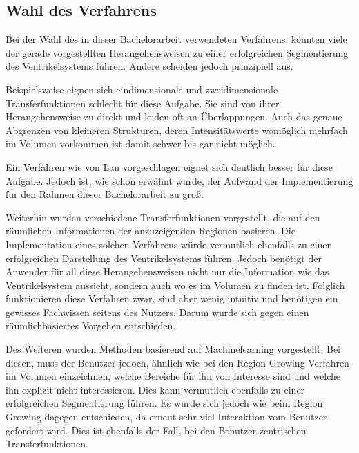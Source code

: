 \subsection{Wahl des Verfahrens}


Bei der Wahl des in dieser Bachelorarbeit verwendeten Verfahrens, könnten viele der gerade vorgestellten Herangehensweisen zu einer erfolgreichen Segmentierung des Ventrikelsystems führen. Andere scheiden jedoch prinzipiell aus.


Beispielsweise eignen sich eindimensionale und zweidimensionale Transferfunktionen schlecht für diese Aufgabe. Sie sind von ihrer Herangehensweise zu direkt und leiden oft an Überlappungen. Auch das genaue Abgrenzen von kleineren Strukturen, deren Intensitätswerte womöglich mehrfach im Volumen vorkommen ist damit schwer bis gar nicht möglich.


Ein Verfahren wie von Lan \cite{lan2017improving} vorgeschlagen eignet sich deutlich besser für diese Aufgabe. Jedoch ist, wie schon erwähnt wurde, der Aufwand der Implementierung für den Rahmen dieser Bachelorarbeit zu groß.


Weiterhin wurden verschiedene Transferfunktionen vorgestellt, die auf den räumlichen Informationen der anzuzeigenden Regionen basieren. Die Implementation eines solchen Verfahrens würde vermutlich ebenfalls zu einer erfolgreichen Darstellung des Ventrikelsystems führen.
\newline
Jedoch benötigt der Anwender für all diese Herangehensweisen nicht nur die Information wie das Ventrikelsystem aussieht, sondern auch wo es im Volumen zu finden ist. Folglich funktionieren diese Verfahren zwar, sind aber wenig intuitiv und benötigen ein gewisses Fachwissen seitens des Nutzers. Darum wurde sich gegen einen räumlichbasiertes Vorgehen entschieden.


Des Weiteren wurden Methoden basierend auf Machinelearning vorgestellt. Bei diesen, muss der Benutzer jedoch, ähnlich wie bei den Region Growing Verfahren im Volumen einzeichnen, welche Bereiche für ihn von Interesse sind und welche ihn explizit nicht interessieren.
\newline
Dies kann vermutlich ebenfalls zu einer erfolgreichen Segmentierung führen. Es wurde sich jedoch wie beim Region Growing dagegen entschieden, da erneut sehr viel Interaktion vom Benutzer gefordert wird.
\newline
Dies ist ebenfalls der Fall, bei den Benutzer-zentrischen Transferfunktionen.


